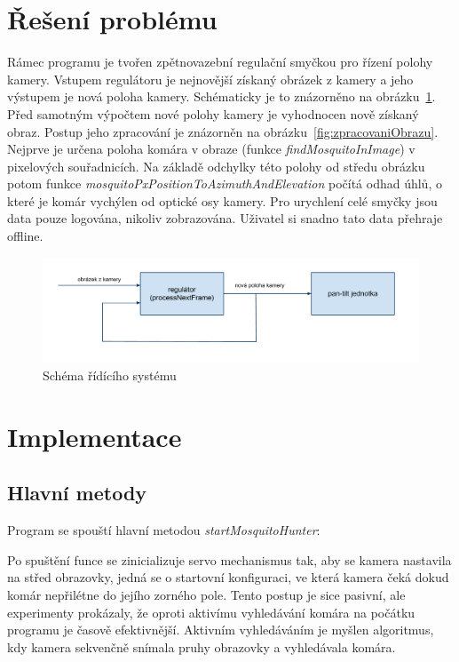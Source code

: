 \documentclass[a4paper,10pt]{article}
\begin{document}
\section{Řešení problému}

		Rámec programu je tvořen zpětnovazební regulační smyčkou pro řízení polohy
		kamery. Vstupem regulátoru je nejnovější získaný obrázek z kamery a jeho
		výstupem je nová poloha kamery. Schématicky je to znázorněno na
		obrázku~\ref{fig:ridiciSystem}.  Před samotným výpočtem nové polohy kamery
		je vyhodnocen nově získaný obraz. Postup jeho zpracování je znázorněn na
		obrázku~\ref{fig:zpracovaniObrazu}.  Nejprve je určena poloha komára v obraze
		(funkce \textit{findMosquitoInImage}) v pixelových souřadnicích. Na základě odchylky
		této polohy od středu obrázku potom funkce
		\textit{mosquitoPxPositionToAzimuthAndElevation} počítá odhad úhlů, o které je
		komár vychýlen od optické osy kamery. Pro urychlení celé smyčky jsou data pouze
		logována, nikoliv zobrazována. Uživatel si snadno tato data přehraje offline.

		\begin{figure}[!h]
			\centering
			 \includegraphics[width=1\columnwidth]{pics/schema_ridiciho_systemu}
			 \caption{Schéma řídícího systému}\label{fig:ridiciSystem}
		\end{figure}


\section{Implementace}

\subsection{Hlavní metody}

		Program se spouští hlavní metodou \textit{startMosquitoHunter}:

		Po spuštění funce se zinicializuje servo mechanismus tak, aby se kamera
		nastavila na střed obrazovky, jedná se o startovní konfiguraci, ve která kamera
		čeká dokud komár nepřilétne do jejího zorného pole. Tento postup je sice
		pasivní, ale experimenty prokázaly, že oproti aktivímu vyhledávání komára na
		počátku programu je časově efektivnější. Aktivním vyhledáváním je myšlen
		algoritmus, kdy kamera sekvenčně snímala pruhy obrazovky a vyhledávala komára.
\end{document}
